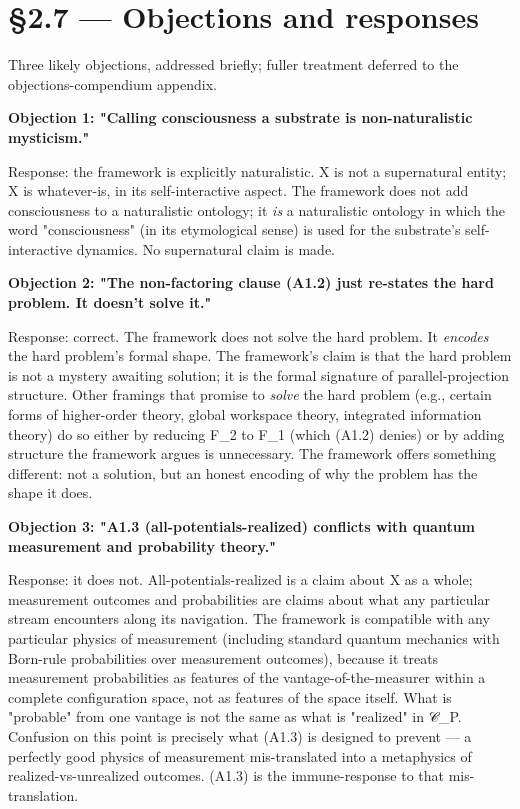 \documentclass[11pt, openany]{book}
\newcommand{\sectionbreak}{\clearpage}
\begin{document}
\sectionbreak

\section{§2.7 --- Objections and responses}

Three likely objections, addressed briefly; fuller treatment deferred to the objections-compendium appendix.

\textbf{Objection 1: "Calling consciousness a substrate is non-naturalistic mysticism."}

Response: the framework is explicitly naturalistic. X is not a supernatural entity; X is whatever-is, in its self-interactive aspect. The framework does not add consciousness to a naturalistic ontology; it \textit{is} a naturalistic ontology in which the word "consciousness" (in its etymological sense) is used for the substrate's self-interactive dynamics. No supernatural claim is made.

\textbf{Objection 2: "The non-factoring clause (A1.2) just re-states the hard problem. It doesn't solve it."}

Response: correct. The framework does not solve the hard problem. It \textit{encodes} the hard problem's formal shape. The framework's claim is that the hard problem is not a mystery awaiting solution; it is the formal signature of parallel-projection structure. Other framings that promise to \textit{solve} the hard problem (e.g., certain forms of higher-order theory, global workspace theory, integrated information theory) do so either by reducing F\_\allowbreak{}2 to F\_\allowbreak{}1 (which (A1.2) denies) or by adding structure the framework argues is unnecessary. The framework offers something different: not a solution, but an honest encoding of why the problem has the shape it does.

\textbf{Objection 3: "A1.3 (all-potentials-realized) conflicts with quantum measurement and probability theory."}

Response: it does not. All-potentials-realized is a claim about X as a whole; measurement outcomes and probabilities are claims about what any particular stream encounters along its navigation. The framework is compatible with any particular physics of measurement (including standard quantum mechanics with Born-rule probabilities over measurement outcomes), because it treats measurement probabilities as features of the vantage-of-the-measurer within a complete configuration space, not as features of the space itself. What is "probable" from one vantage is not the same as what is "realized" in 𝒞\_\allowbreak{}P. Confusion on this point is precisely what (A1.3) is designed to prevent --- a perfectly good physics of measurement mis-translated into a metaphysics of realized-vs-unrealized outcomes. (A1.3) is the immune-response to that mis-translation.
\end{document}
